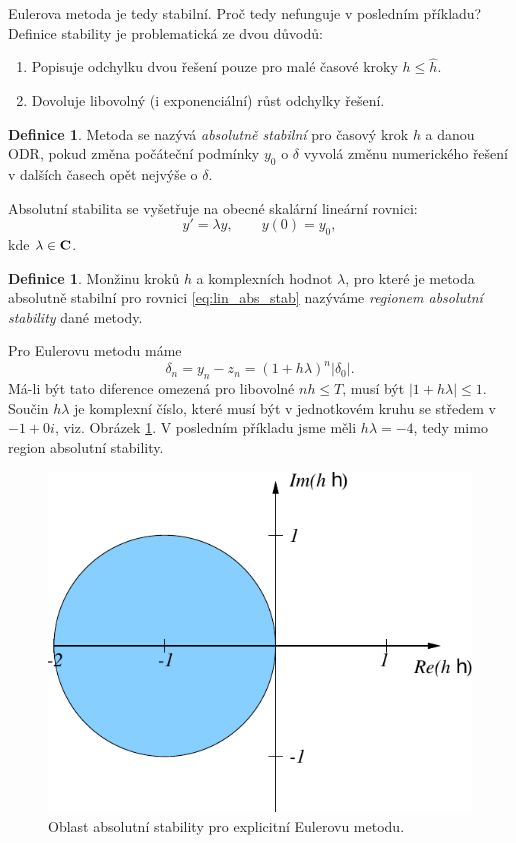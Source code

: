 \documentclass[a4paper, 12pt]{book}
\theoremstyle{definition}
\newtheorem{definition}[theorem]{Definice}
\def\abs#1{\lvert#1\rvert}
\def\df#1{\emph{#1}}
\begin{document}
Eulerova metoda je tedy stabilní. Proč tedy nefunguje v posledním příkladu? Definice stability je problematická ze dvou důvodů:
\begin{enumerate}
 \item Popisuje odchylku dvou řešení pouze pro malé časové kroky $h \le \hat h$.
 \item Dovoluje libovolný (i exponenciální) růst odchylky řešení.
\end{enumerate}

\begin{definition}
 Metoda se nazývá \df{absolutně stabilní} pro časový krok $h$ a danou ODR, pokud změna počáteční podmínky $y_0$ o $\delta$ vyvolá změnu numerického řešení v dalších 
 časech opět nejvýše o $\delta$.
\end{definition}

Absolutní stabilita se vyšetřuje na obecné skalární lineární rovnici:
\begin{equation}
  \label{eq:lin_abs_stab}
  y' = \lambda y,\qquad y(0) =y_0,
\end{equation}
kde $\lambda \in \bf{C}$.

\begin{definition}
 Monžinu kroků $h$ a komplexních hodnot $\lambda$, pro které je metoda absolutně stabilní pro rovnici \eqref{eq:lin_abs_stab}
 nazýváme \df{regionem absolutní stability} dané metody.
\end{definition}

Pro Eulerovu metodu máme
\[
    \delta_n = y_n - z_n = (1+h\lambda)^n \abs{\delta_0}.
\]
Má-li být tato diference omezená pro libovolné $nh\le T$, musí být $\abs{1+h\lambda}\le 1$. 
Součin $h\lambda$ je komplexní číslo, které musí být v jednotkovém kruhu se středem v $-1+0i$,
viz. Obrázek \ref{fig:as_explicit_euler}.
V posledním příkladu jsme měli $h\lambda = -4$, tedy mimo region absolutní stability.

\begin{figure}[h]
    \label{fig:as_explicit_euler}
    \centering
    \includegraphics[scale=0.5]{as_explicit_euler.pdf}
    \caption{Oblast absolutní stability pro explicitní Eulerovu metodu.}
\end{figure}
\end{document}
